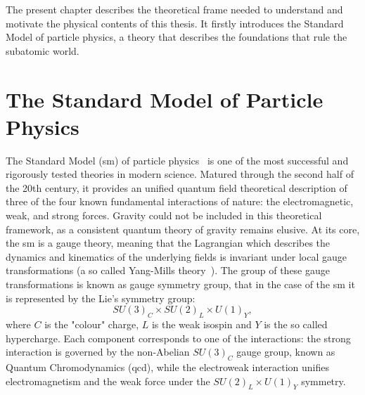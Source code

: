 The present chapter describes the theoretical frame needed to understand and motivate the physical contents of this thesis. 
It firstly introduces the Standard Model of particle physics, a theory that describes the foundations that rule the subatomic world. 

\section{The Standard Model of Particle Physics}
\label{sec:SM_intro}
The Standard Model (\acrshort{sm}) of particle physics~\cite{Griffiths,ellis2013higgsphysics,pich2012,Djouadi_2008} is one of the most successful and rigorously tested theories in modern science. Matured through the second half of the 20th century, it provides an unified quantum field theoretical description of three of the four known fundamental interactions of nature: the electromagnetic, weak, and strong forces. Gravity could not be included in this theoretical framework, as a consistent quantum theory of gravity remains elusive. 
At its core, the \acrshort{sm} is a gauge theory, meaning that the Lagrangian which describes the dynamics and kinematics of the underlying fields is invariant under local gauge transformations (a so called Yang-Mills theory~\cite{YMills}). The group of these gauge transformations is known as gauge symmetry group, that in the case of the \acrshort{sm} it is represented by the Lie's symmetry group:
\begin{equation}
    SU(3)_C \times SU(2)_L \times U(1)_Y,
\end{equation}
where $C$ is the "colour" charge, $L$ is the weak isospin and $Y$ is the so called hypercharge. Each component corresponds to one of the interactions: the strong interaction is governed by the non-Abelian $SU(3)_C$ gauge group, known as Quantum Chromodynamics (\acrshort{qcd}), while the electroweak interaction unifies electromagnetism and the weak force under the $SU(2)_L \times U(1)_Y$ symmetry.

